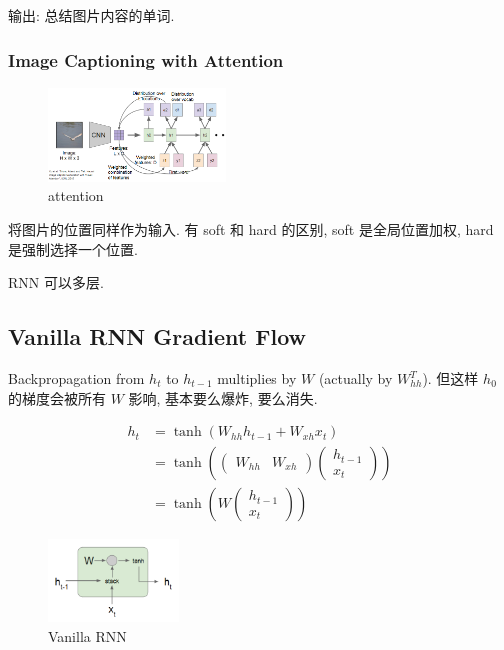 输出: 总结图片内容的单词.

\subsubsection{Image Captioning with Attention}

\begin{figure}[!htb]
    \centering
    \includegraphics[width=0.42\textwidth]{pic/lec10/attention.png}
    \caption{attention}
\end{figure}

将图片的位置同样作为输入. 有 soft 和 hard 的区别, soft 是全局位置加权, hard 是强制选择一个位置. 

RNN 可以多层. 

\subsection{Vanilla RNN Gradient Flow}
Backpropagation from $h_t$ to $h_{t-1} $ multiplies by $W$ (actually by $W_{hh}^T$). 但这样 $h_0$ 的梯度会被所有 $W$ 影响, 基本要么爆炸, 要么消失.

\begin{align*}
    h_t&=\tanh(W_{hh}h_{t-1}+W_{xh}x_t)\\
    &=\tanh\left( \begin{pmatrix}
        W_{hh} & W_{xh}
    \end{pmatrix}\begin{pmatrix}
        h_{t-1} \\ x_t
    \end{pmatrix} \right)\\
    &=\tanh\left( W\begin{pmatrix}
        h_{t-1}\\ x_t
    \end{pmatrix} \right)
\end{align*}

\begin{figure}[!htb]
    \centering
    \includegraphics[width=0.309\textwidth]{pic/Lec10/Vanilla RNN}
    \caption{Vanilla RNN}
\end{figure}

